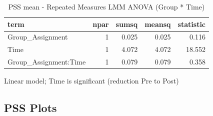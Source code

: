 \documentclass[
]{article}
\begin{document}
\begin{longtable}[t]{lrrrr}
\caption{\label{tab:unnamed-chunk-9}PSS mean - Repeated Measures LMM ANOVA (Group * Time)}\\
\toprule
term & npar & sumsq & meansq & statistic\\
\midrule
Group\_Assignment & 1 & 0.025 & 0.025 & 0.116\\
Time & 1 & 4.072 & 4.072 & 18.552\\
Group\_Assignment:Time & 1 & 0.079 & 0.079 & 0.358\\
\bottomrule
\end{longtable}

Linear model; Time is significant (reduction Pre to Post)

\subsection{PSS Plots}\label{pss-plots}
\end{document}
